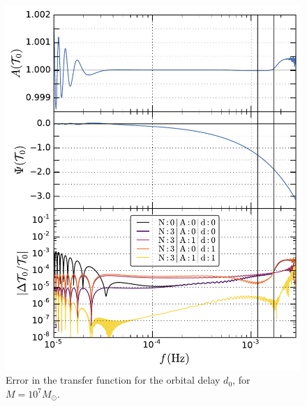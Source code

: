 \documentclass[aps,showpacs,twocolumn,
prd,superscriptaddress,nofootinbib]{revtex4-1}
\newcommand{\Msol}{M_{\odot}}
\begin{document}
\begin{figure}
  \centering
  \includegraphics[width=.98\linewidth]{plots/LISAtransfererrorM1e7dO_py.pdf}
  \caption{Error in the transfer function for the orbital delay $d_{0}$, for $M=10^{7} \Msol$.}
  \label{fig:LISAerrorM1e7orb}
\end{figure}
\end{document}

